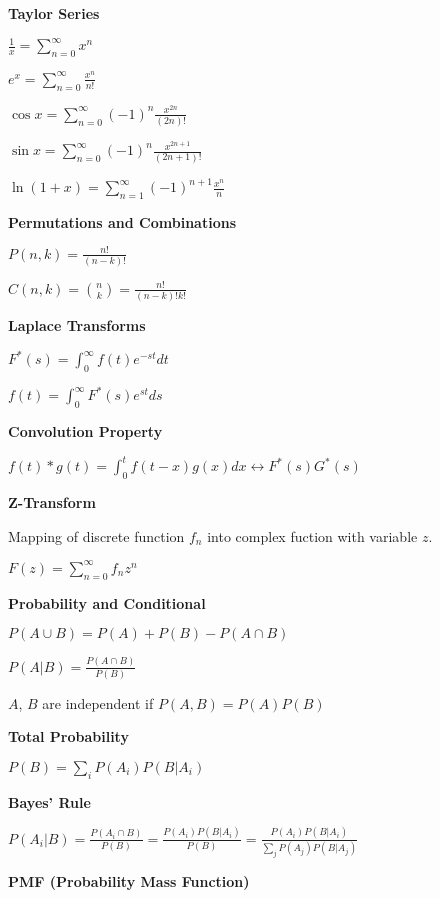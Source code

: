 \documentclass[10pt]{article}
\begin{document}
\raggedright
\begin{multicols*}{3}



{\bf Taylor Series}

$\frac{1}{x} = \sum_{n=0}^{\infty}x^n$

$e^x = \sum_{n=0}^{\infty}\frac{x^n}{n!}$

$\cos x = \sum_{n=0}^{\infty}(-1)^n\frac{x^{2n}}{(2n)!}$

$\sin x = \sum_{n=0}^{\infty}(-1)^n\frac{x^{2n+1}}{(2n+1)!}$

$\ln(1+x) = \sum_{n=1}^{\infty}(-1)^{n+1}\frac{x^n}{n}$



{\bf Permutations and Combinations}

$P(n,k)=\frac{n!}{(n-k)!}$

$C(n,k) = {n\choose k} = \frac{n!}{(n-k)!k!}$



{\bf Laplace Transforms}

$F^*(s)=\int_0^\infty f(t)e^{-st}dt$

$f(t) = \int_0^\infty F^*(s)e^{st}ds$



{\bf Convolution Property}

$f(t)*g(t)=\int_0^t f(t-x)g(x)dx \leftrightarrow F^*(s)G^*(s)$



{\bf Z-Transform}

Mapping of discrete function $f_n$ into complex fuction with variable $z$.

$F(z)=\sum_{n=0}^{\infty}f_nz^n$



{\bf Probability and Conditional}

$P(A\cup B) = P(A) + P(B) - P(A\cap B)$

$P(A|B) = \frac{P(A\cap B)}{P(B)}$

$A$, $B$ are independent if $P(A,B)=P(A)P(B)$



{\bf Total Probability}

$P(B) = \sum_{i} P(A_i)P(B|A_i)$



{\bf Bayes' Rule}

$P(A_i|B) = \frac{P(A_i\cap B)}{P(B)} = \frac{P(A_i)P(B|A_i)}{P(B)} = \frac{P(A_i)P(B|A_i)}{\sum_jP(A_j)P(B|A_j)}$



{\bf PMF (Probability Mass Function)}


\end{multicols*}
\end{document}
